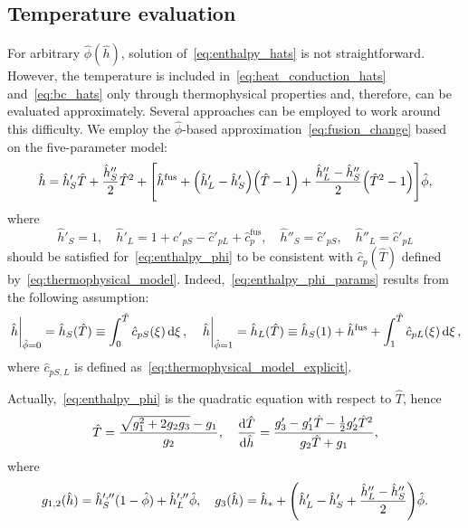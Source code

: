 \documentclass{article}
\newcommand{\fusion}[1]{{#1}^\mathrm{fus}}
\newcommand{\Hh}{\hat{h}}
\newcommand{\HT}{\hat{T}}
\newcommand{\Hc}{\hat{c}}
\newcommand{\Hphi}{\hat{\phi}}
\begin{document}
\subsection{Temperature evaluation}

For arbitrary \(\Hphi(\Hh)\), solution of~\eqref{eq:enthalpy_hats} is not straightforward.
However, the temperature is included in~\eqref{eq:heat_conduction_hats} and~\eqref{eq:bc_hats}
only through thermophysical properties and, therefore, can be evaluated approximately.
Several approaches can be employed to work around this difficulty.
We employ the \(\Hphi\)-based approximation~\eqref{eq:fusion_change} based on the five-parameter model:
\begin{equation}\label{eq:enthalpy_phi}
    \Hh = \Hh'_S\HT + \frac{\Hh''_S}2\HT^2 + \qty[
        \fusion{\Hh} + \qty(\Hh'_L-\Hh'_S) \qty(\HT-1) + \frac{\Hh''_L-\Hh''_S}2 \qty( \HT^2-1 )
    ]\Hphi,
\end{equation}
where
\begin{equation}\label{eq:enthalpy_phi_params}
    \Hh'_S = 1, \quad \Hh'_L = 1 + \Hc'_{pS} - \Hc'_{pL} + \fusion{\Hc}_p, \quad
    \Hh''_S = \Hc'_{pS}, \quad \Hh''_L = \Hc'_{pL}
\end{equation}
should be satisfied for~\eqref{eq:enthalpy_phi} to be consistent with \(\Hc_p(\HT)\)
defined by~\eqref{eq:thermophysical_model}.
Indeed,~\eqref{eq:enthalpy_phi_params} results from the following assumption:
\begin{equation}\label{eq:enthalpy_phi_explicit}
    \eval{\Hh}_{\Hphi=0} = \Hh_S(\HT) \equiv \int_0^{\HT} \Hc_{pS}(\xi)\dd{\xi}, \quad
    \eval{\Hh}_{\Hphi=1} = \Hh_L(\HT) \equiv \Hh_S(1) + \fusion{\Hh} + \int_1^{\HT} \Hc_{pL}(\xi)\dd{\xi},
\end{equation}
where \(\Hc_{pS,L}\) is defined as~\eqref{eq:thermophysical_model_explicit}.

Actually,~\eqref{eq:enthalpy_phi} is the quadratic equation with respect to \(\HT\), hence
\begin{equation}\label{eq:temp_phi}
    \HT = \frac{\sqrt{g_1^2 + 2g_2g_3}-g_1}{g_2}, \quad
    \dv{\HT}{\Hh} = \frac{g_3' - g_1'\HT - \frac12g_2'\HT^2}{g_2\HT + g_1},
\end{equation}
where
\begin{equation}\label{eq:enthalpy3_phi}
    g_{1,2}(\Hh) = \Hh_S^{\prime,\prime\prime} (1-\Hphi) + \Hh_L^{\prime,\prime\prime}\Hphi, \quad
    g_3(\Hh) = \Hh_* + \qty(\Hh_L' - \Hh_S' + \frac{\Hh_L'' - \Hh_S''}2)\Hphi.
\end{equation}
\end{document}
